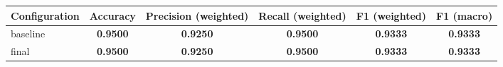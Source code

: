 \begin{tabular}{lccccc}
\hline
Configuration & Accuracy & Precision (weighted) & Recall (weighted) & F1 (weighted) & F1 (macro) \\
\hline
baseline & \textbf{0.9500} & \textbf{0.9250} & \textbf{0.9500} & \textbf{0.9333} & \textbf{0.9333} \\
final & \textbf{0.9500} & \textbf{0.9250} & \textbf{0.9500} & \textbf{0.9333} & \textbf{0.9333} \\
\hline
\end{tabular}
